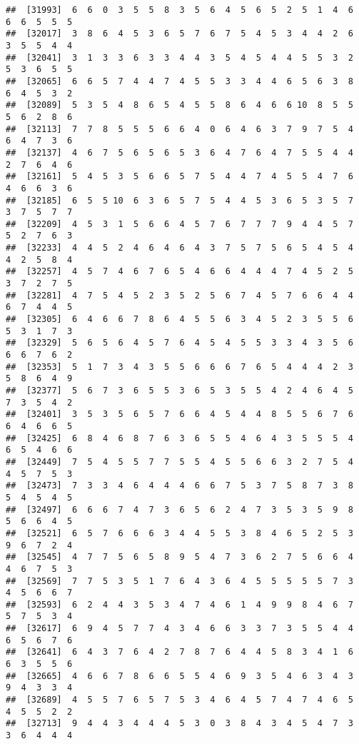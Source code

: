 \documentclass[
]{book}
\begin{document}
\begin{verbatim}
##  [31993]  6  6  0  3  5  5  8  3  5  6  4  5  6  5  2  5  1  4  6  6  6  5  5  5
##  [32017]  3  8  6  4  5  3  6  5  7  6  7  5  4  5  3  4  4  2  6  3  5  5  4  4
##  [32041]  3  1  3  3  6  3  3  4  4  3  5  4  5  4  4  5  5  3  2  5  3  6  5  5
##  [32065]  6  6  5  7  4  4  7  4  5  5  3  3  4  4  6  5  6  3  8  6  4  5  3  2
##  [32089]  5  3  5  4  8  6  5  4  5  5  8  6  4  6  6 10  8  5  5  5  6  2  8  6
##  [32113]  7  7  8  5  5  5  6  6  4  0  6  4  6  3  7  9  7  5  4  6  4  7  3  6
##  [32137]  4  6  7  5  6  5  6  5  3  6  4  7  6  4  7  5  5  4  4  2  7  6  4  6
##  [32161]  5  4  5  3  5  6  6  5  7  5  4  4  7  4  5  5  4  7  6  4  6  6  3  6
##  [32185]  6  5  5 10  6  3  6  5  7  5  4  4  5  3  6  5  3  5  7  3  7  5  7  7
##  [32209]  4  5  3  1  5  6  6  4  5  7  6  7  7  7  9  4  4  5  7  5  2  7  6  3
##  [32233]  4  4  5  2  4  6  4  6  4  3  7  5  7  5  6  5  4  5  4  4  2  5  8  4
##  [32257]  4  5  7  4  6  7  6  5  4  6  6  4  4  4  7  4  5  2  5  3  7  2  7  5
##  [32281]  4  7  5  4  5  2  3  5  2  5  6  7  4  5  7  6  6  4  4  6  7  4  4  5
##  [32305]  6  4  6  6  7  8  6  4  5  5  6  3  4  5  2  3  5  5  6  5  3  1  7  3
##  [32329]  5  6  5  6  4  5  7  6  4  5  4  5  5  3  3  4  3  5  6  6  6  7  6  2
##  [32353]  5  1  7  3  4  3  5  5  6  6  6  7  6  5  4  4  4  2  3  5  8  6  4  9
##  [32377]  5  6  7  3  6  5  5  3  6  5  3  5  5  4  2  4  6  4  5  7  3  5  4  2
##  [32401]  3  5  3  5  6  5  7  6  6  4  5  4  4  8  5  5  6  7  6  6  4  6  6  5
##  [32425]  6  8  4  6  8  7  6  3  6  5  5  4  6  4  3  5  5  5  4  6  5  4  6  6
##  [32449]  7  5  4  5  5  7  7  5  5  4  5  5  6  6  3  2  7  5  4  4  5  7  5  3
##  [32473]  7  3  3  4  6  4  4  4  6  6  7  5  3  7  5  8  7  3  8  5  4  5  4  5
##  [32497]  6  6  6  7  4  7  3  6  5  6  2  4  7  3  5  3  5  9  8  5  6  6  4  5
##  [32521]  6  5  7  6  6  6  3  4  4  5  5  3  8  4  6  5  2  5  3  9  6  7  2  4
##  [32545]  4  7  7  5  6  5  8  9  5  4  7  3  6  2  7  5  6  6  4  4  6  7  5  3
##  [32569]  7  7  5  3  5  1  7  6  4  3  6  4  5  5  5  5  5  7  3  4  5  6  6  7
##  [32593]  6  2  4  4  3  5  3  4  7  4  6  1  4  9  9  8  4  6  7  5  7  5  3  4
##  [32617]  6  9  4  5  7  7  4  3  4  6  6  3  3  7  3  5  5  4  4  6  5  6  7  6
##  [32641]  6  4  3  7  6  4  2  7  8  7  6  4  4  5  8  3  4  1  6  6  3  5  5  6
##  [32665]  4  6  6  7  8  6  6  5  5  4  6  9  3  5  4  6  3  4  3  9  4  3  3  4
##  [32689]  4  5  5  7  6  5  7  5  3  4  6  4  5  7  4  7  4  6  5  4  5  5  2  2
##  [32713]  9  4  4  3  4  4  4  5  3  0  3  8  4  3  4  5  4  7  3  3  6  4  4  4

\end{verbatim}
\end{document}
